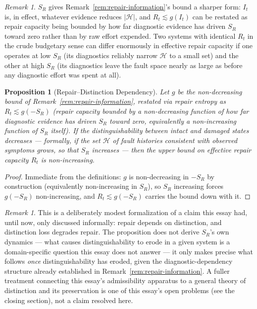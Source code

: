 \documentclass[11pt,a4paper]{article}
\theoremstyle{plain}
\newtheorem{proposition}[theorem]{Proposition}
\theoremstyle{definition}
\theoremstyle{remark}
\newtheorem{remark}[theorem]{Remark}
\begin{document}
\begin{remark}
$S_R$ gives Remark~\ref{rem:repair-information}'s bound a sharper form: $I_t$ is, in effect, whatever evidence reduces $|\mathcal{H}|$, and $R_t \lesssim g(I_t)$ can be restated as repair capacity being bounded by how far diagnostic evidence has driven $S_R$ toward zero rather than by raw effort expended. Two systems with identical $R_t$ in the crude budgetary sense can differ enormously in effective repair capacity if one operates at low $S_R$ (its diagnostics reliably narrow $\mathcal{H}$ to a small set) and the other at high $S_R$ (its diagnostics leave the fault space nearly as large as before any diagnostic effort was spent at all).
\end{remark}

\begin{proposition}[Repair--Distinction Dependency]
\label{prop:repair-distinction}
Let $g$ be the non-decreasing bound of Remark~\ref{rem:repair-information}, restated via repair entropy as $R_t \lesssim g(-S_R)$ (repair capacity bounded by a non-decreasing function of how far diagnostic evidence has driven $S_R$ toward zero, equivalently a non-increasing function of $S_R$ itself). If the distinguishability between intact and damaged states decreases — formally, if the set $\mathcal{H}$ of fault histories consistent with observed symptoms grows, so that $S_R$ increases — then the upper bound on effective repair capacity $R_t$ is non-increasing.
\end{proposition}

\begin{proof}
Immediate from the definitions: $g$ is non-decreasing in $-S_R$ by construction (equivalently non-increasing in $S_R$), so $S_R$ increasing forces $g(-S_R)$ non-increasing, and $R_t \lesssim g(-S_R)$ carries the bound down with it.
\end{proof}

\begin{remark}
This is a deliberately modest formalization of a claim this essay had, until now, only discussed informally: repair depends on distinction, and distinction loss degrades repair. The proposition does not derive $S_R$'s own dynamics — what causes distinguishability to erode in a given system is a domain-specific question this essay does not answer — it only makes precise what follows \emph{once} distinguishability has eroded, given the diagnostic-dependency structure already established in Remark~\ref{rem:repair-information}. A fuller treatment connecting this essay's admissibility apparatus to a general theory of distinction and its preservation is one of this essay's open problems (see the closing section), not a claim resolved here.
\end{remark}
\end{document}

